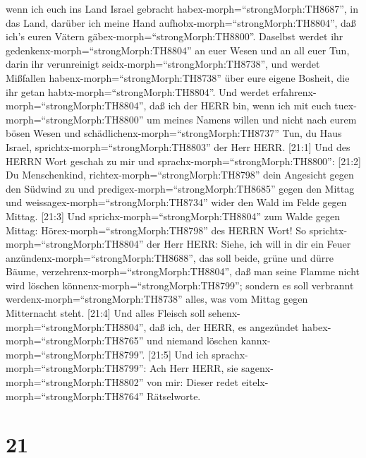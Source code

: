 wenn ich euch ins Land Israel gebracht
habex-morph=``strongMorph:TH8687'', in das Land, darüber ich meine Hand
aufhobx-morph=``strongMorph:TH8804'', daß ich's euren Vätern
gäbex-morph=``strongMorph:TH8800''.  Daselbst werdet ihr
gedenkenx-morph=``strongMorph:TH8804'' an euer Wesen und an all euer
Tun, darin ihr verunreinigt seidx-morph=``strongMorph:TH8738'', und
werdet Mißfallen habenx-morph=``strongMorph:TH8738'' über eure eigene
Bosheit, die ihr getan habtx-morph=``strongMorph:TH8804''. 
Und werdet erfahrenx-morph=``strongMorph:TH8804'', daß ich der HERR bin,
wenn ich mit euch tuex-morph=``strongMorph:TH8800'' um meines Namens
willen und nicht nach eurem bösen Wesen und
schädlichenx-morph=``strongMorph:TH8737'' Tun, du Haus Israel,
sprichtx-morph=``strongMorph:TH8803'' der Herr HERR. 
{[}21:1{]} Und des HERRN Wort geschah zu mir und
sprachx-morph=``strongMorph:TH8800'':  {[}21:2{]} Du
Menschenkind, richtex-morph=``strongMorph:TH8798'' dein Angesicht gegen
den Südwind zu und predigex-morph=``strongMorph:TH8685'' gegen den
Mittag und weissagex-morph=``strongMorph:TH8734'' wider den Wald im
Felde gegen Mittag.  {[}21:3{]} Und
sprichx-morph=``strongMorph:TH8804'' zum Walde gegen Mittag:
Hörex-morph=``strongMorph:TH8798'' des HERRN Wort! So
sprichtx-morph=``strongMorph:TH8804'' der Herr HERR: Siehe, ich will in
dir ein Feuer anzündenx-morph=``strongMorph:TH8688'', das soll beide,
grüne und dürre Bäume, verzehrenx-morph=``strongMorph:TH8804'', daß man
seine Flamme nicht wird löschen könnenx-morph=``strongMorph:TH8799'';
sondern es soll verbrannt werdenx-morph=``strongMorph:TH8738'' alles,
was vom Mittag gegen Mitternacht steht.  {[}21:4{]} Und
alles Fleisch soll sehenx-morph=``strongMorph:TH8804'', daß ich, der
HERR, es angezündet habex-morph=``strongMorph:TH8765'' und niemand
löschen kannx-morph=``strongMorph:TH8799''.  {[}21:5{]} Und
ich sprachx-morph=``strongMorph:TH8799'': Ach Herr HERR, sie
sagenx-morph=``strongMorph:TH8802'' von mir: Dieser redet
eitelx-morph=``strongMorph:TH8764'' Rätselworte.

\hypertarget{section-20}{%
\section{21}\label{section-20}}

